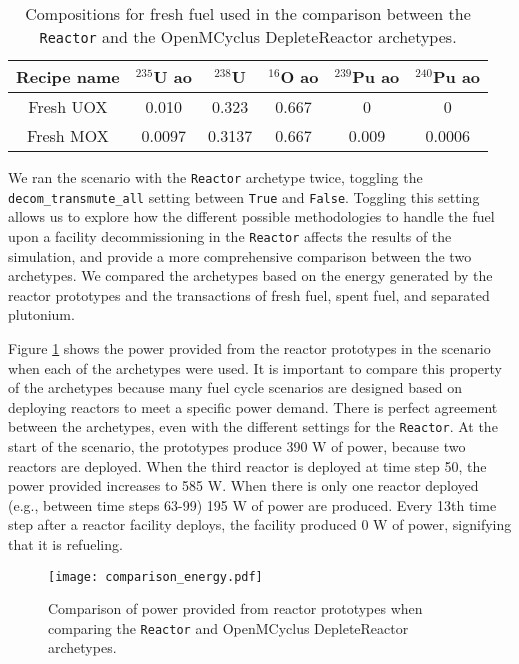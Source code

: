\begin{table}
    \centering 
    \caption{Compositions for fresh fuel used in the comparison between 
    the \Cycamore \texttt{Reactor} and the OpenMCyclus DepleteReactor 
    archetypes.}
    \label{tab:comparison_comps}
    \begin{tabular}{c c c c c c}
        \hline
        Recipe name & $^{235}$U ao & $^{238}$U & $^{16}$O ao & $^{239}$Pu ao & $^{240}$Pu ao\\
        \hline
        Fresh UOX &0.010 & 0.323 & 0.667 & 0 & 0 \\
        Fresh MOX & 0.0097 & 0.3137 & 0.667 & 0.009 & 0.0006\\
        \hline
    \end{tabular}
\end{table}

We ran the scenario with the \Cycamore \texttt{Reactor} archetype twice, 
toggling the \texttt{decom\_transmute\_all} setting between \texttt{True}
and \texttt{False}. Toggling this setting allows us to explore how the 
different possible methodologies to handle the fuel upon a facility 
decommissioning in the \Cycamore \texttt{Reactor} affects the results of 
the simulation, and provide a more comprehensive comparison between the 
two archetypes. We compared the archetypes based on the energy generated 
by the reactor prototypes and the transactions of fresh fuel, spent fuel, 
and separated plutonium. 

Figure \ref{fig:comparison_power} shows the power provided from the
reactor prototypes in the scenario when each of the archetypes were used.
It is important to compare this property of the archetypes because many 
fuel cycle scenarios are designed based on deploying reactors to meet a 
specific power demand. 
There is perfect agreement between the archetypes, even with the different 
settings for the \Cycamore \texttt{Reactor}. At the start of the scenario, 
the prototypes produce 390 W of power, because two reactors are 
deployed. When the third reactor is deployed at time step 50, 
the power provided increases to 585 W. When there is only one  
reactor deployed (e.g., between time steps 63-99) 195 W of power 
are produced. Every 13th time step after a reactor facility deploys, 
the facility produced 0 W of power, signifying that it is refueling.

\begin{figure}[ht]
    \centering 
    \texttt{[image: comparison\_energy.pdf]}
    \caption{Comparison of power provided from reactor prototypes 
    when comparing the \Cycamore \texttt{Reactor} and OpenMCyclus 
    DepleteReactor archetypes.}
    \label{fig:comparison_power}
\end{figure}

